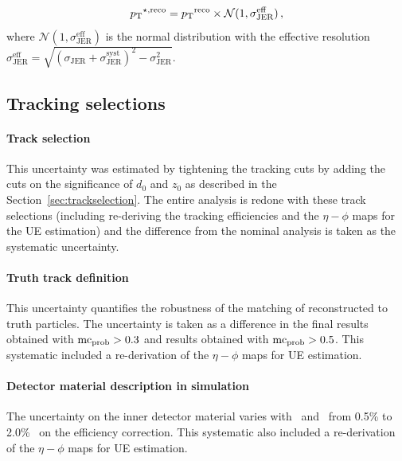 \begin{align}
\mbox{$p_{\mathrm{T}}$}^{\star, \mathrm{reco}} = \mbox{$p_{\mathrm{T}}$}^{\mathrm{reco}}\times \mathcal{N}(1,\sigma^{\mathrm{eff}}_{\mathrm{JER}})\,,
\end{align}
where $\mathcal{N}(1,\sigma^{\mathrm{eff}}_{\mathrm{JER}})$ is the normal distribution with the effective resolution $\sigma^{\mathrm{eff}}_{\mathrm{JER}}=\sqrt{(\sigma_{\mathrm{JER}} + \sigma^{\mathrm{syst}}_{\mathrm{JER}})^{2} - \sigma_{\mathrm{JER}}^{2}}$.



\subsection{Tracking selections}
\paragraph{Track selection}
This uncertainty was estimated by tightening the tracking cuts by adding the cuts on the significance of $d_0$ and $z_0$ as described in the Section~\ref{sec:trackselection}. 
The entire analysis is redone with these track selections (including re-deriving the tracking efficiencies and the $\eta-\phi$ maps for the UE estimation) and the difference from the nominal analysis is taken as the systematic uncertainty.

\paragraph{Truth track definition}  
This uncertainty quantifies the robustness of the matching of reconstructed to truth particles.
The uncertainty is taken as a difference in the final results obtained with  $\mbox{${\mathrm{mc}}_{\mathrm{prob}}$} > 0.3$ and results obtained with $ \mbox{${\mathrm{mc}}_{\mathrm{prob}}$} > 0.5$.
This systematic included a re-derivation of the $\eta-\phi$ maps for UE estimation.

\paragraph{Detector material description in simulation}
The uncertainty on the inner detector material varies with \pttrk\ and \etatrk\ from 0.5\% to 2.0\%~\cite{ref:tracktwiki} on the efficiency correction.
This systematic also included a re-derivation of the $\eta-\phi$ maps for UE estimation.

